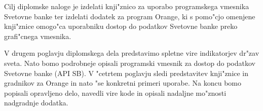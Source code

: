 Cilj diplomske naloge je izdelati knji"znico za uporabo programskega vmesnika
Svetovne banke ter izdelati dodatek za program Orange, ki s pomo"cjo omenjene
knji"znice omogo"ca uporabniku dostop do podatkov Svetovne banke preko 
grafi"cnega vmesnika.


V drugem poglavju diplomskega dela predstavimo spletne vire indikatorjev
dr"zav sveta. Nato bomo podrobneje opisali programski vmesnik za dostop do 
podatkov Svetovne banke (API SB). V "cetrtem poglavju sledi predstavitev 
knji"znice in gradnikov za Orange in nato "se konkretni primeri uporabe. Na koncu
bomo popisali opravljeno delo, navedli vire kode in opisali nadaljne mo"znosti
nadgradnje dodatka.










                                                                                
                                                                                
                         

